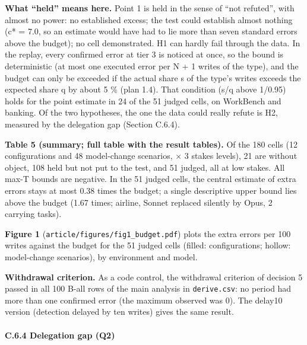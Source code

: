 \textbf{What ``held'' means here.} Point 1 is held in the sense of ``not refuted'', with almost no power: no established excess; the test could establish almost nothing (c* = 7.0, so an estimate would have had to lie more than seven standard errors above the budget); no cell demonstrated. H1 can hardly fail through the data. In the replay, every confirmed error at tier 3 is noticed at once, so the bound is deterministic (at most one executed error per N + 1 writes of the type), and the budget can only be exceeded if the actual share s of the type's writes exceeds the expected share q by about 5 \% (plan 1.4). That condition (s/q above 1/0.95) holds for the point estimate in 24 of the 51 judged cells, on WorkBench and banking. Of the two hypotheses, the one the data could really refute is H2, measured by the delegation gap (Section C.6.4).

\textbf{Table 5 (summary; full table with the result tables).} Of the 180 cells (12 configurations and 48 model-change scenarios, × 3 stakes levels), 21 are without object, 108 held but not put to the test, and 51 judged, all at low stakes. All max-T bounds are negative. In the 51 judged cells, the central estimate of extra errors stays at most 0.38 times the budget; a single descriptive upper bound lies above the budget (1.67 times; airline, Sonnet replaced silently by Opus, 2 carrying tasks).

\textbf{Figure 1} (\texttt{article/\allowbreak{}figures/\allowbreak{}fig1\_\allowbreak{}budget.\allowbreak{}pdf}) plots the extra errors per 100 writes against the budget for the 51 judged cells (filled: configurations; hollow: model-change scenarios), by environment and model.

\textbf{Withdrawal criterion.} As a code control, the withdrawal criterion of decision 5 passed in all 100 B-all rows of the main analysis in \texttt{derive.\allowbreak{}csv}: no period had more than one confirmed error (the maximum observed was 0). The delay10 version (detection delayed by ten writes) gives the same result.

\paragraph{C.6.4 Delegation gap (Q2)}\label{c.6.4-delegation-gap-q2}

